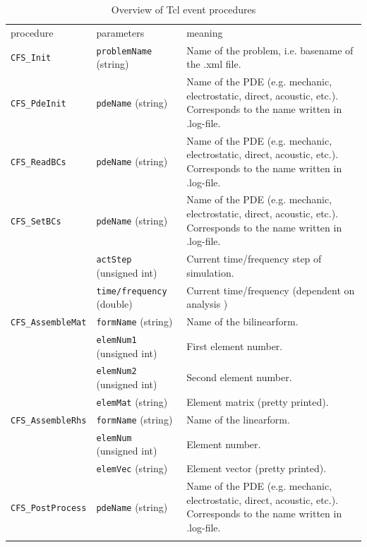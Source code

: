 \begin{center}
\begin{longtable}{llp{}}
\hline\noalign{\smallskip}
procedure & parameters & meaning\\
\noalign{\smallskip}\hline\noalign{\smallskip}
\verb#CFS_Init# & \verb#problemName# (string) 
                & Name of the problem, i.e. basename
                 of the .xml file. \\
\noalign{\smallskip}\hline\noalign{\smallskip}
\verb#CFS_PdeInit# & \verb#pdeName# (string)  
                   & Name of the PDE (e.g. mechanic,
                   electrostatic, direct, acoustic, etc.). Corresponds to the
name
                   written in .log-file.\\
\noalign{\smallskip}\hline\noalign{\smallskip}
\verb#CFS_ReadBCs# & \verb#pdeName# (string)  
                   & Name of the PDE (e.g. mechanic,
                   electrostatic, direct, acoustic, etc.). Corresponds to the name
                   written in .log-file.\\
\noalign{\smallskip}\hline
\verb#CFS_SetBCs# & \verb#pdeName# (string)  
                  & Name of the PDE (e.g. mechanic,
                  electrostatic, direct, acoustic, etc.). Corresponds to the name
                  written in .log-file.\\
                  & \verb#actStep# (unsigned int) 
                  & Current time/frequency step of simulation. \\
                  & \verb#time/frequency# (double)  
                  & Current time/frequency  (dependent on analysis ) \\
\noalign{\smallskip}\hline
\verb#CFS_AssembleMat# & \verb#formName# (string)  
                  & Name of the bilinearform.\\
                  & \verb#elemNum1# (unsigned int) 
                  & First element number. \\
                  & \verb#elemNum2# (unsigned int) 
                  & Second element number. \\
                  & \verb#elemMat# (string)  
                  & Element matrix (pretty printed). \\
\noalign{\smallskip}\hline
\verb#CFS_AssembleRhs# & \verb#formName# (string)  
                  & Name of the linearform.\\
                  & \verb#elemNum# (unsigned int) 
                  & Element number. \\
                  & \verb#elemVec# (string)  
                  & Element vector (pretty printed). \\
\noalign{\smallskip}\hline
\verb#CFS_PostProcess# & \verb#pdeName# (string)  
                       & Name of the PDE (e.g. mechanic,
                       electrostatic, direct, acoustic, etc.). Corresponds to the name
                       written in .log-file.\\
\caption{Overview of Tcl event procedures}
\label{tab:tcl-events}
\end{longtable}

\end{center}

